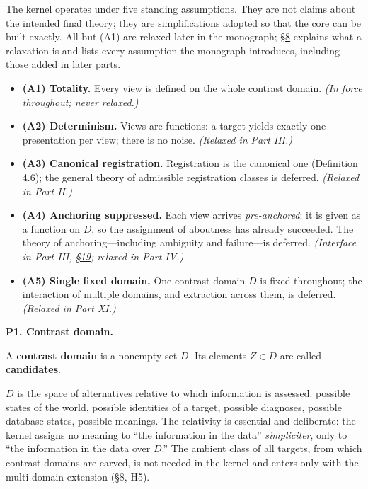 

The kernel operates under five standing assumptions. They are not claims about the intended final theory; they are simplifications adopted so that the core can be built exactly. All but (A1) are relaxed later in the monograph; \hyperlink{sec:8}{§8} explains what a relaxation is and lists every assumption the monograph introduces, including those added in later parts.

\begin{itemize}
\tightlist
\item
  \textbf{(A1) Totality.} Every view is defined on the whole contrast domain. \emph{(In force throughout; never relaxed.)}
\item
  \textbf{(A2) Determinism.} Views are functions: a target yields exactly one presentation per view; there is no noise. \emph{(Relaxed in Part III.)}
\item
  \textbf{(A3) Canonical registration.} Registration is the canonical one (Definition 4.6); the general theory of admissible registration classes is deferred. \emph{(Relaxed in Part II.)}
\item
  \textbf{(A4) Anchoring suppressed.} Each view arrives \emph{pre-anchored}: it is given as a function on \(D\), so the assignment of aboutness has already succeeded. The theory of anchoring---\hspace{0pt}including ambiguity and failure---\hspace{0pt}is deferred. \emph{(Interface in Part III, \hyperlink{sec:19}{§19}; relaxed in Part IV.)}
\item
  \textbf{(A5) Single fixed domain.} One contrast domain \(D\) is fixed throughout; the interaction of multiple domains, and extraction across them, is deferred. \emph{(Relaxed in Part XI.)}
\end{itemize}


\textbf{P1. Contrast domain.}

\begin{thmdef}

A \textbf{contrast domain} is a nonempty set \(D\). Its elements \(Z \in D\) are called \textbf{candidates}.
\end{thmdef}

\(D\) is the space of alternatives relative to which information is assessed: possible states of the world, possible identities of a target, possible diagnoses, possible database states, possible meanings. The relativity is essential and deliberate: the kernel assigns no meaning to ``the information in the data'' \emph{simpliciter}, only to ``the information in the data over \(D\).'' The ambient class of all targets, from which contrast domains are carved, is not needed in the kernel and enters only with the multi-domain extension (§8, H5).

